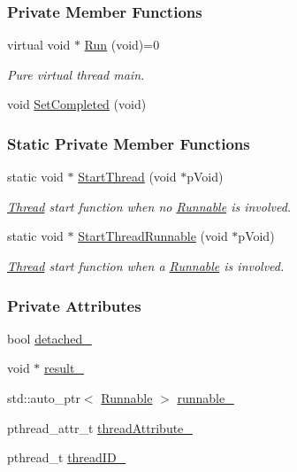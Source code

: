\subsubsection*{Private Member Functions}
\begin{DoxyCompactItemize}
\item 
virtual void $\ast$ \hyperlink{group___core_ae46cda1b57e998b239a8b9710b0712e2}{Run} (void)=0
\begin{DoxyCompactList}\small\item\em Pure virtual thread main. \end{DoxyCompactList}\item 
void \hyperlink{group___core_ac32823199dc71dd77daba9bc9cb72c3e}{Set\-Completed} (void)
\end{DoxyCompactItemize}
\subsubsection*{Static Private Member Functions}
\begin{DoxyCompactItemize}
\item 
static void $\ast$ \hyperlink{group___core_a9698abb1d7e2aed626b1963635455840}{Start\-Thread} (void $\ast$p\-Void)
\begin{DoxyCompactList}\small\item\em \hyperlink{group___core_class_thread}{Thread} start function when no \hyperlink{group___core_class_runnable}{Runnable} is involved. \end{DoxyCompactList}\item 
static void $\ast$ \hyperlink{group___core_a215c9e3a0965e061e7d36aa5adfe4791}{Start\-Thread\-Runnable} (void $\ast$p\-Void)
\begin{DoxyCompactList}\small\item\em \hyperlink{group___core_class_thread}{Thread} start function when a \hyperlink{group___core_class_runnable}{Runnable} is involved. \end{DoxyCompactList}\end{DoxyCompactItemize}
\subsubsection*{Private Attributes}
\begin{DoxyCompactItemize}
\item 
bool \hyperlink{group___core_a2b6b46b7eb56cffef7d0722649956c5d}{detached\-\_\-}
\item 
void $\ast$ \hyperlink{group___core_a56c923629f0131b37a2b8c1f74a1e2b0}{result\-\_\-}
\item 
std\-::auto\-\_\-ptr$<$ \hyperlink{group___core_class_runnable}{Runnable} $>$ \hyperlink{group___core_a4e2c7c71f666a7c4404f8fc03a57f2d7}{runnable\-\_\-}
\item 
pthread\-\_\-attr\-\_\-t \hyperlink{group___core_a2fbeb3f285f074698a3323bfdd7e5d2a}{thread\-Attribute\-\_\-}
\item 
pthread\-\_\-t \hyperlink{group___core_a8a7056f4641e224b016506ec0fc1078b}{thread\-I\-D\-\_\-}
\end{DoxyCompactItemize}


